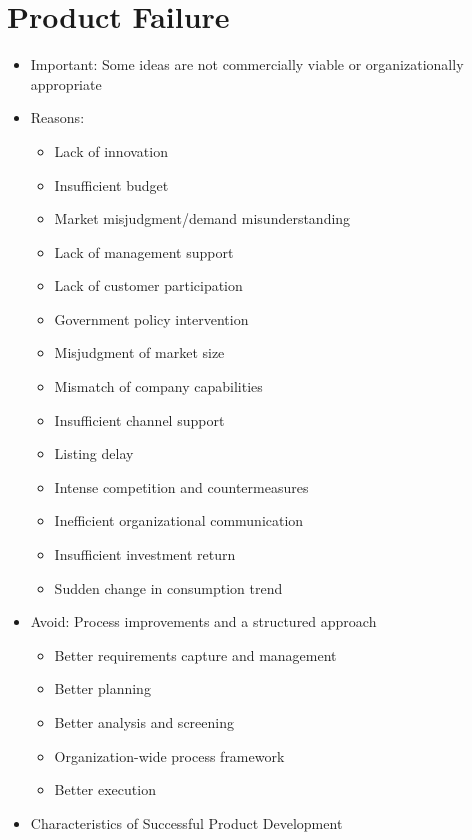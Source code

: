 \documentclass[openany,12pt,a4paper]{book}
\begin{document}
\section{Product Failure}
\begin{itemize}
    \item Important: Some ideas are not commercially viable or organizationally appropriate
    \item Reasons:
    \begin{itemize}
        \item Lack of innovation
        \item Insufficient budget
        \item Market misjudgment/demand misunderstanding
        \item Lack of management support
        \item Lack of customer participation
        \item Government policy intervention
        \item Misjudgment of market size
        \item Mismatch of company capabilities
        \item Insufficient channel support
        \item Listing delay
        \item Intense competition and countermeasures
        \item Inefficient organizational communication
        \item Insufficient investment return
        \item Sudden change in consumption trend
    \end{itemize}
    \item Avoid: Process improvements and a structured approach
    \begin{itemize}
        \item Better requirements capture and management
        \item Better planning
        \item Better analysis and screening
        \item Organization-wide process framework
        \item Better execution
    \end{itemize}
    \item Characteristics of Successful Product Development
\end{itemize}
    
\end{document}
